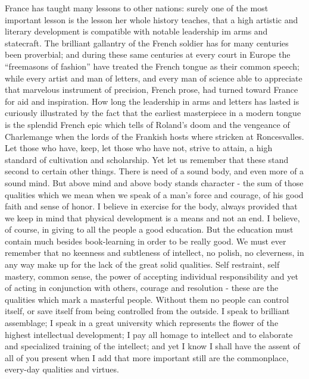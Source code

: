 \documentclass{scrbook}
\begin{document}
France has taught many lessons to other nations: surely one of the most important
lesson is the lesson her whole history teaches, that a high artistic and literary development
is compatible with notable leadership im arms and statecraft. The brilliant gallantry of the
French soldier has for many centuries been proverbial; and during these same centuries at
every court in Europe the “freemasons of fashion” have treated the French tongue as their
common speech; while every artist and man of letters, and every man of science able to
appreciate that marvelous instrument of precision, French prose, had turned toward France
for aid and inspiration. How long the leadership in arms and letters has lasted is curiously
illustrated by the fact that the earliest masterpiece in a modern tongue is the splendid French
epic which tells of Roland’s doom and the vengeance of Charlemange when the lords of the
Frankish hosts where stricken at Roncesvalles. Let those who have, keep, let those who have
not, strive to attain, a high standard of cultivation and scholarship. Yet let us remember that
these stand second to certain other things. There is need of a sound body, and even more of
a sound mind. But above mind and above body stands character - the sum of those qualities
which we mean when we speak of a man’s force and courage, of his good faith and sense of
honor. I believe in exercise for the body, always provided that we keep in mind that physical
development is a means and not an end. I believe, of course, in giving to all the people a
good education. But the education must contain much besides book-learning in order to
be really good. We must ever remember that no keenness and subtleness of intellect, no
polish, no cleverness, in any way make up for the lack of the great solid qualities. Self
restraint, self mastery, common sense, the power of accepting individual responsibility and
yet of acting in conjunction with others, courage and resolution - these are the qualities
which mark a masterful people. Without them no people can control itself, or save itself
from being controlled from the outside. I speak to brilliant assemblage; I speak in a great
university which represents the flower of the highest intellectual development; I pay all
homage to intellect and to elaborate and specialized training of the intellect; and yet I know
I shall have the assent of all of you present when I add that more important still are the
commonplace, every-day qualities and virtues.
\end{document}
